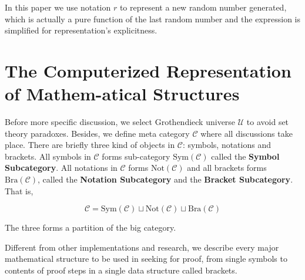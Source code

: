 \documentclass{aims}
\numberwithin{equation}{section}
\numberwithin{theorem}{section}	%
\numberwithin{axiom}{section}	%
\numberwithin{definition}{section}	%
\begin{document}
	In this paper we use notation \(\mathit{r}\) to represent a new random number generated, which is actually a pure function of the last random number and the expression is simplified for representation{'}s explicitness.
	
	\section{The Computerized Representation of Mathem-atical Structures}
	
	Before more specific discussion, we select Grothendieck universe \(\mathcal{U}\) \cite{Li2019} to avoid set theory paradoxes. Besides, we define meta category \(\mathcal{C}\) where all discussions take place. There are briefly three kind of objects in \(\mathcal{C}\): symbols, notations and brackets. All symbols in \(\mathcal{C}\) forms sub-category \(\text{Sym}(\mathcal{C})\) called the \textbf{ Symbol Subcategory}. All notations in \(\mathcal{C}\) forms \(\text{Not}(\mathcal{C})\) and all brackets forms \(\text{Bra}(\mathcal{C})\), called the \textbf{ Notation Subcategory} and the \textbf{ Bracket Subcategory}. That is,
	
	\begin{equation}
		\mathcal{C}=\text{Sym}(\mathcal{C})\sqcup \text{Not}(\mathcal{C})\sqcup \text{Bra}(\mathcal{C})
	\end{equation}
	
	The three forms a partition of the big category.
	
	Different from other implementations and research, we describe every major mathematical structure to be used in seeking for proof, from single symbols to contents of proof steps in a single data structure called brackets.
	
\end{document}
